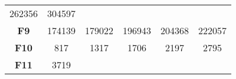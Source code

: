 \documentclass[12pt,a4paper]{article}
\begin{document}
\begin{longtable}[c]{@{}cccccc@{}}
\begin{minipage}[t]{0.10\columnwidth}
262356
\strut\end{minipage} &
\begin{minipage}[t]{0.10\columnwidth}\centering\strut
304597
\strut\end{minipage}\tabularnewline
\begin{minipage}[t]{0.12\columnwidth}\centering\strut
\textbf{F9}
\strut\end{minipage} &
\begin{minipage}[t]{0.08\columnwidth}\centering\strut
174139
\strut\end{minipage} &
\begin{minipage}[t]{0.08\columnwidth}\centering\strut
179022
\strut\end{minipage} &
\begin{minipage}[t]{0.09\columnwidth}\centering\strut
196943
\strut\end{minipage} &
\begin{minipage}[t]{0.10\columnwidth}\centering\strut
204368
\strut\end{minipage} &
\begin{minipage}[t]{0.10\columnwidth}\centering\strut
222057
\strut\end{minipage}\tabularnewline
\begin{minipage}[t]{0.12\columnwidth}\centering\strut
\textbf{F10}
\strut\end{minipage} &
\begin{minipage}[t]{0.08\columnwidth}\centering\strut
817
\strut\end{minipage} &
\begin{minipage}[t]{0.08\columnwidth}\centering\strut
1317
\strut\end{minipage} &
\begin{minipage}[t]{0.09\columnwidth}\centering\strut
1706
\strut\end{minipage} &
\begin{minipage}[t]{0.10\columnwidth}\centering\strut
2197
\strut\end{minipage} &
\begin{minipage}[t]{0.10\columnwidth}\centering\strut
2795
\strut\end{minipage}\tabularnewline
\begin{minipage}[t]{0.12\columnwidth}\centering\strut
\textbf{F11}
\strut\end{minipage} &
\begin{minipage}[t]{0.08\columnwidth}\centering\strut
3719
\strut\end{minipage} &
\begin{minipage}[t]{0.08\columnwidth}\centering\strut

\end{minipage}
\end{longtable}
\end{document}
